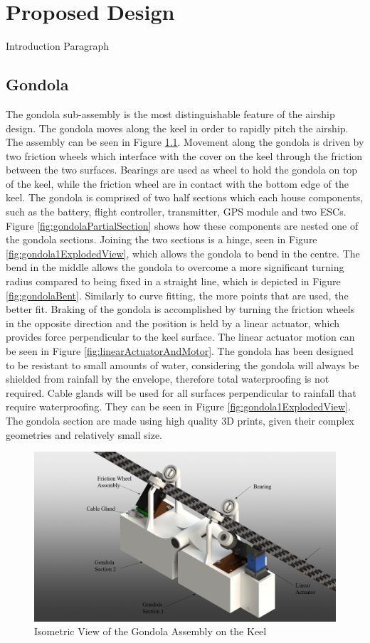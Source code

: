 \documentclass[../main.tex]{subfiles}
\begin{document}
\chapter{Proposed Design}
Introduction Paragraph
\section{Gondola}
The gondola sub-assembly is the most distinguishable feature of the airship design. The gondola moves along the keel in order to rapidly pitch the airship. The assembly can be seen in  Figure \ref{fig:gondolaIsomeric}. Movement along the gondola is driven by two friction wheels which interface with the cover on the keel through the friction between the two surfaces. Bearings are used as wheel to hold the gondola on top of the keel, while the friction wheel are in contact with the bottom edge of the keel. The gondola is comprised of two half sections which each house components, such as the battery, flight controller, transmitter, GPS module and two ESCs. Figure \ref{fig:gondolaPartialSection} shows how these components are  nested one of the gondola sections. Joining the two sections is a hinge, seen in Figure  \ref{fig:gondola1ExplodedView}, which allows the gondola to bend in the centre. The bend in the middle allows the gondola to overcome a more significant turning radius compared to being fixed in a straight line, which is depicted in Figure \ref{fig:gondolaBent}. Similarly to curve fitting, the more points that are used, the better fit. Braking of the gondola is accomplished by turning the friction wheels in the opposite direction and the position is held by a linear actuator, which provides force perpendicular to the keel surface. The linear actuator motion can be seen in Figure \ref{fig:linearActuatorAndMotor}. The gondola has been designed to be resistant to small amounts of water, considering the gondola will always be shielded from rainfall by the envelope, therefore total waterproofing is not required. Cable glands will be used for all surfaces perpendicular to rainfall that require waterproofing. They can be seen in Figure \ref{fig:gondola1ExplodedView}. The gondola section are made using high quality 3D prints, given their complex geometries and relatively small size.
\\

\begin{figure}[H]
	\centering
	\includegraphics[width=.8\linewidth]{img/design/gondola/gondolaIsometric.png}
	\caption{Isometric View of the Gondola Assembly on the Keel}
	\label{fig:gondolaIsomeric}
\end{figure}
\end{document}
